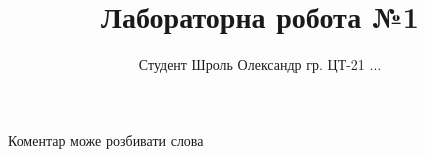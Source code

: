 \documentclass{article}
\title{Лабораторна робота №1}
\author{Студент Шроль Олександр гр. ЦТ-21 ...}
\begin{document}
\maketitle
Коментар може розбивати слова %
\end{document}
